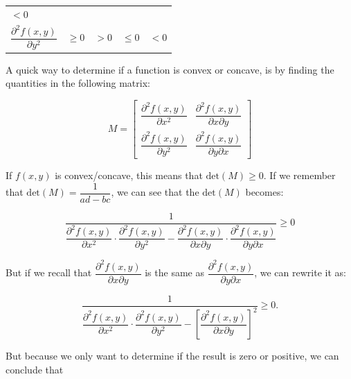 \documentclass[11pt]{article}
\begin{document}
\begin{longtable}[]{@{}lllll@{}}
\begin{minipage}[t]{0.17\columnwidth}
\(< 0\)\strut
\end{minipage}\tabularnewline
\begin{minipage}[t]{0.17\columnwidth}\raggedright
\(\dfrac{\partial^2 f(x,y)}{\partial y^2}\)\strut
\end{minipage} & \begin{minipage}[t]{0.17\columnwidth}\raggedright
\(\geq 0\)\strut
\end{minipage} & \begin{minipage}[t]{0.17\columnwidth}\raggedright
\(>0\)\strut
\end{minipage} & \begin{minipage}[t]{0.17\columnwidth}\raggedright
\(\leq 0\)\strut
\end{minipage} & \begin{minipage}[t]{0.17\columnwidth}\raggedright
\(< 0\)\strut
\end{minipage}\tabularnewline
\bottomrule
\end{longtable}

    A quick way to determine if a function is convex or concave, is by
finding the quantities in the following matrix:

\[ M = \begin{bmatrix} \dfrac{\partial^2 f(x,y)}{\partial x^2} & \dfrac{\partial^2 f(x,y)}{\partial x \partial y} \\ \dfrac{\partial^2 f(x,y)}{\partial y^2} & \dfrac{\partial^2 f(x,y)}{\partial y \partial x}  \end{bmatrix} \]

    If \(f(x,y)\) is convex/concave, this means that
\(\textrm{det}(M) \geq 0\). If we remember that
\(\text{det}(M) = \dfrac{1}{ad-bc}\), we can see that the
\(\textrm{det}(M)\) becomes:

\[ \dfrac{1}{\dfrac{\partial^2 f(x,y)}{\partial x^2} \cdot \dfrac{\partial^2 f(x,y)}{\partial y^2} - \dfrac{\partial^2 f(x,y)}{\partial x \partial y} \cdot \dfrac{\partial^2 f(x,y)}{\partial y \partial x} } \geq 0 \]

    But if we recall that
\(\dfrac{\partial^2 f(x,y)}{\partial x \partial y}\) is the same as
\(\dfrac{\partial^2 f(x,y)}{\partial y \partial x}\), we can rewrite it
as:

\[ \dfrac{1}{\dfrac{\partial^2 f(x,y)}{\partial x^2} \cdot \dfrac{\partial^2 f(x,y)}{\partial y^2} - \left[\dfrac{\partial^2 f(x,y)}{\partial x \partial y}\right]^2  } \geq 0.\]

But because we only want to determine if the result is zero or positive,
we can conclude that
\end{document}

